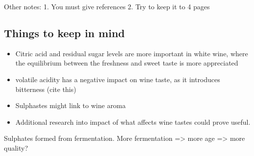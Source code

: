 \documentclass[
]{article}
\providecommand{\tightlist}{%
  \setlength{\itemsep}{0pt}\setlength{\parskip}{0pt}}
\begin{document}
Other notes: 1. You must give references 2. Try to keep it to 4 pages

\subsection{Things to keep in mind}\label{things-to-keep-in-mind}

\begin{itemize}
\tightlist
\item
  Citric acid and residual sugar levels are more important in white
  wine, where the equilibrium between the freshness and sweet taste is
  more appreciated
\item
  volatile acidity has a negative impact on wine taste, as it introduces
  bitterness (cite this)
\item
  Sulphastes might link to wine aroma
\item
  Additional research into impact of what affects wine tastes could
  prove useful.
\end{itemize}

\textcite{TODO} Sulphates formed from fermentation. More fermentation
=\textgreater{} more age =\textgreater{} more quality?

\printbibliography
\end{document}

